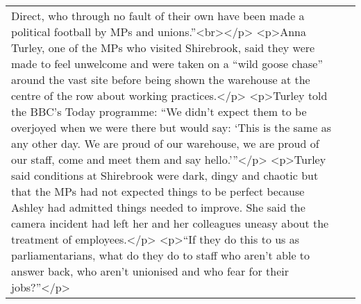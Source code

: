 \documentclass[]{article}
\begin{document}
\begin{table}[!h]
{\begin{tabular}[t]{ll}
Direct, who through no fault of their own have been made a political football by MPs and unions.”<br></p> <p>Anna Turley, one of the MPs who visited Shirebrook, said they were made to feel unwelcome and were taken on a “wild goose chase” around the vast site before being shown the warehouse at the centre of the row about working practices.</p> <p>Turley told the BBC’s Today programme: “We didn’t expect them to be overjoyed when we were there but would say: ‘This is the same as any other day. We are proud of our warehouse, we are proud of our staff, come and meet them and say hello.’”</p> <p>Turley said conditions at Shirebrook were dark, dingy and chaotic but that the MPs had not expected things to be perfect because Ashley had admitted things needed to improve. She said the camera incident had left her and her colleagues uneasy about the treatment of employees.</p> <p>“If they do this to us as parliamentarians, what do they do to staff who aren’t able to answer back, who aren’t unionised and who fear for their jobs?”</p>\\

\end{tabular}}
\end{table}
\end{document}
